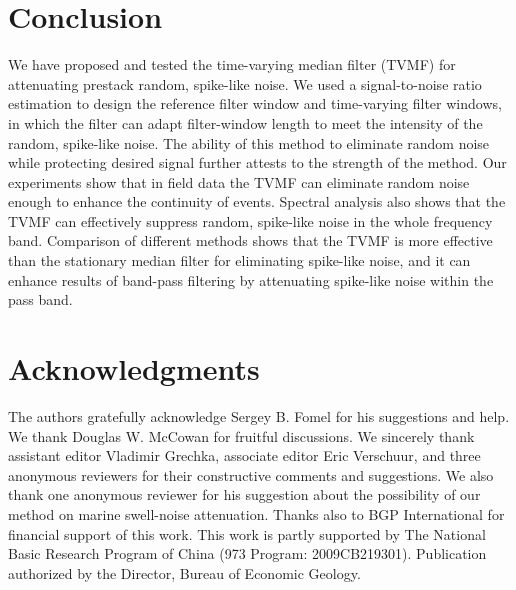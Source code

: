 
 \section{Conclusion}

We have proposed and tested the time-varying median filter 
(TVMF) for attenuating 
prestack random, spike-like noise. We used a signal-to-noise ratio estimation to design 
the reference filter window and time-varying filter windows, in which the filter 
can adapt filter-window length to meet the intensity of the random, spike-like noise.
The ability of this method to eliminate random noise while protecting desired signal 
further attests to the strength of the method.
Our experiments show that in field data the TVMF can eliminate random noise enough to
enhance the continuity of events. Spectral analysis also shows that the TVMF 
can effectively suppress random, spike-like noise in the whole frequency band. Comparison 
of different methods shows that the TVMF is more effective than the stationary 
median filter for eliminating 
spike-like noise, and it can enhance results of band-pass filtering by attenuating 
spike-like noise within the pass band.

\section{Acknowledgments}

The authors gratefully acknowledge Sergey B. Fomel for his suggestions and help. We 
thank Douglas W. McCowan for fruitful discussions. We sincerely thank assistant 
editor Vladimir Grechka, associate editor Eric Verschuur, and three anonymous 
reviewers for their constructive comments and suggestions. We also thank one 
anonymous reviewer for his suggestion about the possibility of our method on marine 
swell-noise attenuation. Thanks also to BGP International for financial support of 
this work. This work is partly supported
by The National Basic Research Program of China (973 Program: 2009CB219301).
Publication authorized by the Director, Bureau of Economic Geology.




